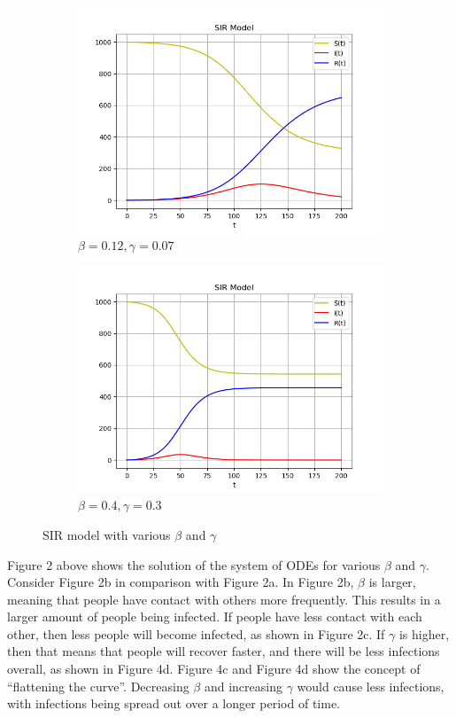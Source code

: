\documentclass{article}
\begin{document}
\begin{figure}[H]
\begin{subfigure}{.5\textwidth}
  \includegraphics[width=\textwidth]{SIR_3.png}
  \caption{$\beta = 0.12, \gamma = 0.07$}
  \label{fig:sub7}
\end{subfigure}%
\begin{subfigure}{.5\textwidth}
  \centering
  \includegraphics[width=\textwidth]{SIR_4.png}
  \caption{$\beta = 0.4, \gamma = 0.3$}
  \label{fig:sub8}
\end{subfigure}

\caption{SIR model with various $\beta$ and $\gamma$}
\label{fig:test2}
\end{figure}

Figure 2 above shows the solution of the system of ODEs for various $\beta$ and $\gamma$. Consider Figure 2b in comparison with Figure 2a. In Figure 2b, $\beta$ is larger, meaning that people have contact with others more frequently. This results in a larger amount of people being infected. If people have less contact with each other, then less people will become infected, as shown in Figure 2c. If $\gamma$ is higher, then that means that people will recover faster, and there will be less infections overall, as shown in Figure 4d. Figure 4c and Figure 4d show the concept of ``flattening the curve''. Decreasing $\beta$ and increasing $\gamma$ would cause less infections, with infections being spread out over a longer period of time.
\end{document}
